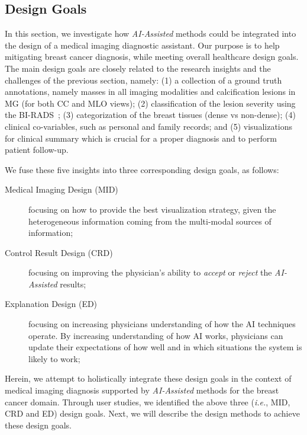 \subsection{Design Goals}
\label{sec:goals}

In this section, we investigate how {\it AI-Assisted} methods could be integrated into the design of a medical imaging diagnostic assistant.
Our purpose is to help mitigating breast cancer diagnosis, while meeting overall healthcare design goals.
The main design goals are closely related to the research insights and the challenges of the previous section, namely:
(1) a collection of a ground truth annotations, namely masses in all imaging modalities and calcification lesions in MG (for both CC and MLO views);
(2) classification of the lesion severity using the BI-RADS~\cite{aghaei2018association};
(3) categorization of the breast tissues (dense vs non-dense);
(4) clinical co-varia\-bles, such as personal and family records; and
(5) visualizations for clinical summary which is crucial for a proper diagnosis and to perform patient follow-up.

\hfill

\noindent
We fuse these five insights into three corresponding design goals, as follows:

\hfill

\begin{description}
\item[Medical Imaging Design (MID)] focusing on how to provide the best visualization strategy, given the heterogeneous information coming from the multi-modal sources of information;

\item[Control Result Design (CRD)] focusing on improving the physician's ability to {\it accept} or {\it reject} the {\it AI-Assisted} results;

\item[Explanation Design (ED)] focusing on increasing physicians understanding of how the AI techniques operate. By increasing understanding of how AI works, physicians can update their expectations of how well and in which situations the system is likely to work;
\end{description}

\hfill

Herein, we  attempt to holistically integrate these design goals in the context of medical imaging diagnosis supported by {\it AI-Assisted} methods for the breast cancer domain.
Through user studies, we identified the above three ({\it i.e.}, MID, CRD and ED) design goals.
Next, we will describe the design methods to achieve these design goals.

